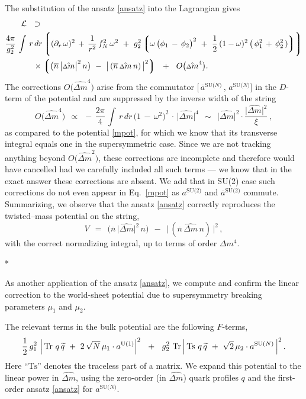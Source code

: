 \documentclass[12pt]{article}
\def\beq{\begin{equation}}
\def\eeq{\end{equation}}
\newcommand{\p}{\partial}
\newcommand{\wt}{\widetilde}
\newcommand{\ov}{\overline}
\newcommand{\mc}[1]{\mathcal{#1}}
\newcommand{\lgr}{\left\lgroup}
\newcommand{\rgr}{\right\rgroup}
\newcommand{\aU}{a^{\rm U(1)}}
\newcommand{\aN}{a^\text{SU($N$)}}
\newcommand{\baN}{\ov{a}{}^\text{SU($N$)}}
\newcommand{\nbar}{\ov{n}}
\newcommand{\Tr}{\text{Tr}}
\newcommand{\Ts}{\text{Ts}}
\newcommand{\dm}{\hat{{\scriptstyle \Delta} m}}
\begin{document}
	The substitution of the ansatz \eqref{ansatz} into the Lagrangian gives
\begin{align}
%
\notag
	&
	\qquad
	\mc{L}    ~~\supset~~  \\
%
\notag
	&
	\frac{4\pi}{g_2^2}\, \int\, r\, dr\,
		\Biggl\lgroup  (\p_r\, \omega)^2 \,+\, \frac{1}{r^2}\, f_N^2\, \omega^2 
			~+~  g_2^2 \lgr \omega\, \big( \phi_1 \,-\, \phi_2 \big)^2  ~+~
				\frac{1}{2}\, (1 - \omega)^2\, \big(\, \phi_1^2 \,+\, \phi_2^2 \,) \rgr
		\Biggr\rgroup
	\\
%
\label{mpot}
	&
	\qquad~~~~\,
	\times
	\lgr  \big( \nbar\, \big| \dm \big|^2\, n \big)  ~-~  \big|\, ( \nbar\, \dm\, n ) \,\big|^2  \rgr
	~~+~~
	O \big( \dm^4 \big).
\end{align}
	The corrections $ O \big( \dm^4 \big) $ arise from the commutator $ \big[\, \baN \,,\, \aN \big] $ 
	in the $D$-term of the potential and are suppressed by the inverse width of the string 
\[
	O \big( \dm^4 \big)    ~~\propto~~   -\, \frac{2\pi}{4}\, \int\, r\, dr\, \big( 1 \,-\, \omega^2 \big)^2
	\,\cdot\, \big| \dm \big|^4     ~~\sim~~    \big| \dm \big|^2 \cdot \frac{ \big| \dm \big|^2 }{ \xi }\,,
\]
	as compared to the potential \eqref{mpot}, for which we know that its transverse integral equals one 
	in the supersymmetric case. 
	Since we are not tracking anything beyond $ O \big( \dm^2 \big) $, these corrections are incomplete
	and therefore would have cancelled had we carefully included all such terms --- 
	we know that in the exact answer these corrections are absent.
	We add that in SU(2) case such corrections do not even appear in Eq.~\eqref{mpot} 
	as $ a^\text{SU(2)} $ and $ \ov{a}{}^\text{SU(2)} $ commute.
	Summarizing, we observe that the ansatz \eqref{ansatz} correctly reproduces the twisted--mass potential 
	on the string, 
\beq
	V    ~~=~~    \big( \nbar\, \big| \dm \big|^2\, n \big)  ~~-~~  \big|\, ( \nbar\, \dm\, n ) \,\big|^2\,,
\eeq
	with the correct normalizing integral, up to terms of order $ \Delta m^4 $.
	

\vspace{0.8cm}
\centerline{*\qquad\qquad\qquad*\qquad\qquad\qquad*}
\vspace{0.8cm}


	As another application of the ansatz \eqref{ansatz}, we compute and confirm the linear correction 
	to the world-sheet potential due to supersymmetry breaking parameters $ \mu_1 $ and $ \mu_2 $.

	The relevant terms in the bulk potential are the following $ F $-terms,
\beq
\label{Fterms}
	\frac{1}{2}\,g_1^2~ \Big|\, \Tr~ q\, \wt{q} ~+~ 2\, \sqrt{N}\, \mu_1 \cdot \aU \Big|^2
	~~+~~
	g_2^2~ \Tr\, \Big|\, \Ts~ q\, \wt{q} ~+~ \sqrt{2}\, \mu_2 \cdot \aN \,\Big|^2\,.
\eeq
	Here ``$ \text{Ts} $'' denotes the traceless part of a matrix.
	We expand this potential to the linear power in $ \dm $, using the zero-order (in $ \dm $) 
	quark profiles $ q $ and the first-order ansatz \eqref{ansatz} for $ \aN $.
\end{document}
